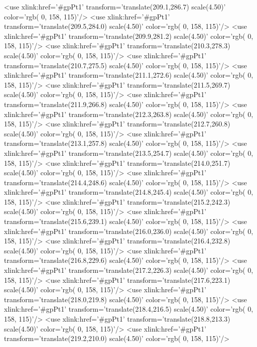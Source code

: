	<use xlink:href='#gpPt1' transform='translate(209.1,286.7) scale(4.50)' color='rgb(  0, 158, 115)'/>
	<use xlink:href='#gpPt1' transform='translate(209.5,284.0) scale(4.50)' color='rgb(  0, 158, 115)'/>
	<use xlink:href='#gpPt1' transform='translate(209.9,281.2) scale(4.50)' color='rgb(  0, 158, 115)'/>
	<use xlink:href='#gpPt1' transform='translate(210.3,278.3) scale(4.50)' color='rgb(  0, 158, 115)'/>
	<use xlink:href='#gpPt1' transform='translate(210.7,275.5) scale(4.50)' color='rgb(  0, 158, 115)'/>
	<use xlink:href='#gpPt1' transform='translate(211.1,272.6) scale(4.50)' color='rgb(  0, 158, 115)'/>
	<use xlink:href='#gpPt1' transform='translate(211.5,269.7) scale(4.50)' color='rgb(  0, 158, 115)'/>
	<use xlink:href='#gpPt1' transform='translate(211.9,266.8) scale(4.50)' color='rgb(  0, 158, 115)'/>
	<use xlink:href='#gpPt1' transform='translate(212.3,263.8) scale(4.50)' color='rgb(  0, 158, 115)'/>
	<use xlink:href='#gpPt1' transform='translate(212.7,260.8) scale(4.50)' color='rgb(  0, 158, 115)'/>
	<use xlink:href='#gpPt1' transform='translate(213.1,257.8) scale(4.50)' color='rgb(  0, 158, 115)'/>
	<use xlink:href='#gpPt1' transform='translate(213.5,254.7) scale(4.50)' color='rgb(  0, 158, 115)'/>
	<use xlink:href='#gpPt1' transform='translate(214.0,251.7) scale(4.50)' color='rgb(  0, 158, 115)'/>
	<use xlink:href='#gpPt1' transform='translate(214.4,248.6) scale(4.50)' color='rgb(  0, 158, 115)'/>
	<use xlink:href='#gpPt1' transform='translate(214.8,245.4) scale(4.50)' color='rgb(  0, 158, 115)'/>
	<use xlink:href='#gpPt1' transform='translate(215.2,242.3) scale(4.50)' color='rgb(  0, 158, 115)'/>
	<use xlink:href='#gpPt1' transform='translate(215.6,239.1) scale(4.50)' color='rgb(  0, 158, 115)'/>
	<use xlink:href='#gpPt1' transform='translate(216.0,236.0) scale(4.50)' color='rgb(  0, 158, 115)'/>
	<use xlink:href='#gpPt1' transform='translate(216.4,232.8) scale(4.50)' color='rgb(  0, 158, 115)'/>
	<use xlink:href='#gpPt1' transform='translate(216.8,229.6) scale(4.50)' color='rgb(  0, 158, 115)'/>
	<use xlink:href='#gpPt1' transform='translate(217.2,226.3) scale(4.50)' color='rgb(  0, 158, 115)'/>
	<use xlink:href='#gpPt1' transform='translate(217.6,223.1) scale(4.50)' color='rgb(  0, 158, 115)'/>
	<use xlink:href='#gpPt1' transform='translate(218.0,219.8) scale(4.50)' color='rgb(  0, 158, 115)'/>
	<use xlink:href='#gpPt1' transform='translate(218.4,216.5) scale(4.50)' color='rgb(  0, 158, 115)'/>
	<use xlink:href='#gpPt1' transform='translate(218.8,213.3) scale(4.50)' color='rgb(  0, 158, 115)'/>
	<use xlink:href='#gpPt1' transform='translate(219.2,210.0) scale(4.50)' color='rgb(  0, 158, 115)'/>
